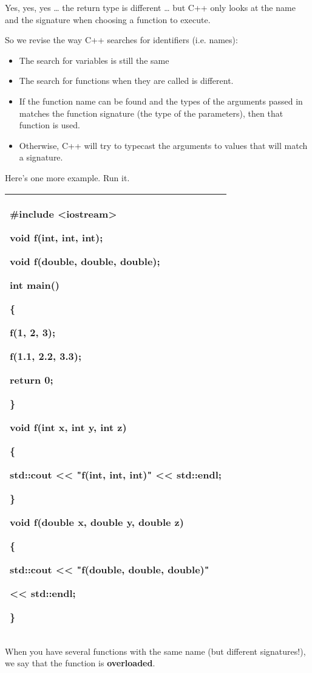 \documentclass[
]{article}
\providecommand{\tightlist}{%
  \setlength{\itemsep}{0pt}\setlength{\parskip}{0pt}}
\begin{document}
Yes, yes, yes \ldots{} the return type is different \ldots{} but C++
only looks at the name and the signature when choosing a function to
execute.

So we revise the way C++ searches for identifiers (i.e. names):

\begin{itemize}
\tightlist
\item
  The search for variables is still the same
\item
  The search for functions when they are called is different.
\item
  If the function name can be found and the types of the arguments
  passed in matches the function signature (the type of the parameters),
  then that function is used.
\item
  Otherwise, C++ will try to typecast the arguments to values that will
  match a signature.
\end{itemize}

Here's one more example. Run it.

\begin{longtable}[]{@{}l@{}}
\toprule
\endhead
\begin{minipage}[t]{0.97\columnwidth}\raggedright
\#include \textless iostream\textgreater{}

void f(int, int, int);

void f(double, double, double);

int main()

\{

f(1, 2, 3);

f(1.1, 2.2, 3.3);

return 0;

\}

void f(int x, int y, int z)

\{

std::cout \textless\textless{} "f(int, int, int)" \textless\textless{}
std::endl;

\}

void f(double x, double y, double z)

\{

std::cout \textless\textless{} "f(double, double, double)"

\textless\textless{} std::endl;

\}\strut
\end{minipage}\tabularnewline
\bottomrule
\end{longtable}

When you have several functions with the same name (but different
signatures!), we say that the function is \textbf{overloaded}.
\end{document}
